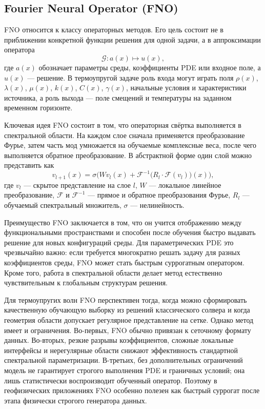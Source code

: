 \subsection*{Fourier Neural Operator (FNO)}

FNO относится к классу операторных методов. Его цель состоит не в приближении конкретной функции решения для одной задачи, а в аппроксимации оператора
\begin{equation}
\mathcal{G}: a(x)\mapsto u(x),
\end{equation}
где $a(x)$ обозначает параметры среды, коэффициенты PDE или входное поле, а $u(x)$ --- решение. В термоупругой задаче роль входа могут играть поля $\rho(x)$, $\lambda(x)$, $\mu(x)$, $k(x)$, $C(x)$, $\gamma(x)$, начальные условия и характеристики источника, а роль выхода --- поле смещений и температуры на заданном временном горизонте.

Ключевая идея FNO состоит в том, что операторная свёртка выполняется в спектральной области. На каждом слое сначала применяется преобразование Фурье, затем часть мод умножается на обучаемые комплексные веса, после чего выполняется обратное преобразование. В абстрактной форме один слой можно представить как
\begin{equation}
v_{l+1}(x)=\sigma\Big(Wv_l(x)+\mathcal{F}^{-1}\big(R_l\cdot \mathcal{F}(v_l)\big)(x)\Big),
\end{equation}
где $v_l$ --- скрытое представление на слое $l$, $W$ --- локальное линейное преобразование, $\mathcal{F}$ и $\mathcal{F}^{-1}$ --- прямое и обратное преобразования Фурье, $R_l$ --- обучаемый спектральный множитель, $\sigma$ --- нелинейность.

Преимущество FNO заключается в том, что он учится отображению между функциональными пространствами и способен после обучения быстро выдавать решение для новых конфигураций среды. Для параметрических PDE это чрезвычайно важно: если требуется многократно решать задачу для разных коэффициентов среды, FNO может стать быстрым суррогатным оператором. Кроме того, работа в спектральной области делает метод естественно чувствительным к глобальным структурам решения.

Для термоупругих волн FNO перспективен тогда, когда можно сформировать качественную обучающую выборку из решений классического солвера и когда геометрия области допускает регулярное представление на сетке. Однако метод имеет и ограничения. Во-первых, FNO обычно привязан к сеточному формату данных. Во-вторых, резкие разрывы коэффициентов, сложные локальные интерфейсы и нерегулярные области снижают эффективность стандартной спектральной параметризации. В-третьих, без дополнительных ограничений модель не гарантирует строгого выполнения PDE и граничных условий; она лишь статистически воспроизводит обученный оператор. Поэтому в геофизических приложениях FNO особенно полезен как быстрый суррогат после этапа физически строгого генератора данных.

